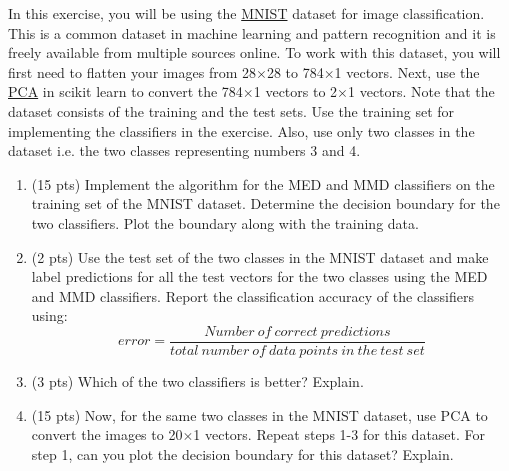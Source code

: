 \documentclass[10pt,letter,notitlepage]{article}
\newcommand{\blue}[1]{{\color{blue}#1}}
\newcommand{\magenta}[1]{{\color{magenta}#1}}
\newcounter{exercise}
\begin{document}
\begin{exercise}
In this exercise, you will be using the \href{https://pytorch.org/vision/stable/datasets.html#mnist}{\magenta{MNIST}} dataset for image classification. This is a common dataset in machine learning and pattern recognition and it is freely available from multiple sources online. To work with this dataset, you will first need to flatten your images from 28$\times$28 to 784$\times$1 vectors. Next, use the \href{https://scikit-learn.org/stable/modules/generated/sklearn.decomposition.PCA.html}{\magenta{PCA}} in scikit learn to convert the 784$\times$1 vectors to 2$\times$1 vectors. \blue{Note} that the dataset consists of the training and the test sets. Use the training set for implementing the classifiers in the exercise. \blue{Also}, use only two classes in the dataset i.e. the two classes representing numbers 3 and 4.

\begin{enumerate}
    \item (15 pts) Implement the algorithm for the MED and MMD classifiers on the training set of the MNIST dataset. Determine the decision boundary for the two classifiers. Plot the boundary along with the training data. 
    \item (2 pts) Use the test set of the two classes in the MNIST dataset and make label predictions for all the test vectors for the two classes using the MED and MMD classifiers. Report the classification accuracy of the classifiers using: 
    \begin{equation}
        error = \frac{Number\ of\ correct\ predictions}{total\ number\ of\ data\ points\ in\ the\ test\ set}    
    \end{equation}
    \item (3 pts) Which of the two classifiers is better? Explain.
    \item (15 pts) Now, for the same two classes in the MNIST dataset, use PCA to convert the images to 20$\times$1 vectors. Repeat steps 1-3 for this dataset. For step 1, can you plot the decision boundary for this dataset? Explain.
    
\end{enumerate}
\end{exercise}
\end{document}

